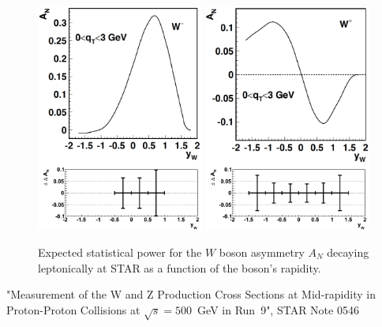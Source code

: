 \documentclass[12pt]{article}
\begin{document}
\begin{figure}[tbhp]
\label{fig:MC_Wmeas_stat} 
\begin{center}
\includegraphics[width=0.49\textwidth]{images/anapow_w_minus}
\includegraphics[width=0.49\textwidth]{images/anapow_w_plus}
\end{center}
\caption{Expected statistical power for the $W$ boson asymmetry $A_N$ decaying
leptonically at STAR as a function of the boson's rapidity.}
\end{figure}



\begin{thebibliography}{9}

"Measurement of the W and Z Production Cross Sections at Mid-rapidity in
Proton-Proton Collisions at $\sqrt{s} = 500$~GeV in Run~9", STAR Note 0546

\end{thebibliography}
\end{document}
